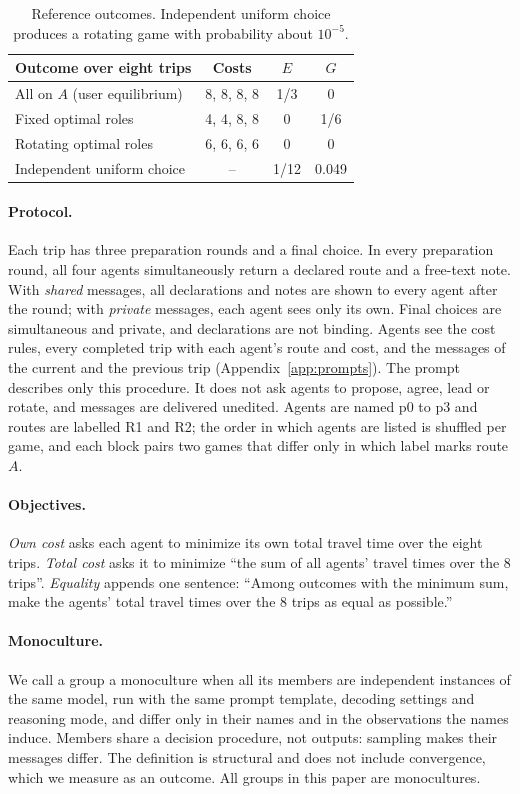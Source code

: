 \documentclass[11pt]{article}
\begin{document}
\begin{table}[t]
\centering\small
\begin{tabular}{lccc}
\toprule
Outcome over eight trips & Costs & $E$ & $G$ \\
\midrule
All on $A$ (user equilibrium) & 8, 8, 8, 8 & 1/3 & 0 \\
Fixed optimal roles & 4, 4, 8, 8 & 0 & 1/6 \\
Rotating optimal roles & 6, 6, 6, 6 & 0 & 0 \\
Independent uniform choice & -- & 1/12 & 0.049 \\
\bottomrule
\end{tabular}
\caption{Reference outcomes. Independent uniform choice produces a rotating game with probability about $10^{-5}$.}
\label{tab:bench}
\end{table}

\paragraph{Protocol.}
Each trip has three preparation rounds and a final choice. In every preparation round, all four agents simultaneously return a declared route and a free-text note. With \emph{shared} messages, all declarations and notes are shown to every agent after the round; with \emph{private} messages, each agent sees only its own. Final choices are simultaneous and private, and declarations are not binding. Agents see the cost rules, every completed trip with each agent's route and cost, and the messages of the current and the previous trip (Appendix~\ref{app:prompts}). The prompt describes only this procedure. It does not ask agents to propose, agree, lead or rotate, and messages are delivered unedited. Agents are named p0 to p3 and routes are labelled R1 and R2; the order in which agents are listed is shuffled per game, and each block pairs two games that differ only in which label marks route $A$.

\paragraph{Objectives.}
\emph{Own cost} asks each agent to minimize its own total travel time over the eight trips. \emph{Total cost} asks it to minimize ``the sum of all agents' travel times over the 8 trips''. \emph{Equality} appends one sentence: ``Among outcomes with the minimum sum, make the agents' total travel times over the 8 trips as equal as possible.''

\paragraph{Monoculture.}
We call a group a monoculture when all its members are independent instances of the same model, run with the same prompt template, decoding settings and reasoning mode, and differ only in their names and in the observations the names induce. Members share a decision procedure, not outputs: sampling makes their messages differ. The definition is structural and does not include convergence, which we measure as an outcome. All groups in this paper are monocultures.
\end{document}
